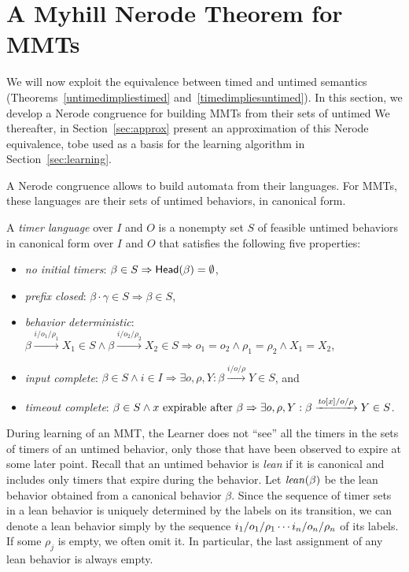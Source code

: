 \section{A Myhill Nerode Theorem for MMTs}
\label{sec:nerode}
\label{sec:bj-nerode}

We will now exploit the equivalence between timed and untimed semantics
(Theorems~\ref{untimedimpliestimed} and~\ref{timedimpliesuntimed}).
In this section, we develop a Nerode congruence for building MMTs
from their sets of untimed
We thereafter, in Section~\ref{sec:approx} present an approximation of this
Nerode equivalence, tobe used as a basis for the learning algorithm in
Section~\ref{sec:learning}.

  A Nerode congruence allows to build automata from their languages. For MMTs,
  these languages are their sets of untimed behaviors, in canonical form.

\begin{definition}
\label{def:timer language}
A \emph{timer language} over $I$ and $O$ is a nonempty set 
$S$ of feasible untimed behaviors in canonical form over $I$ and $O$ that satisfies the following five properties:
\begin{itemize}
\item
\emph{no initial timers}: $\beta \in S \Rightarrow \mathsf{Head}({\beta}) = \emptyset$,
\item
\emph{prefix closed}: $\beta \cdot \gamma \in S \Rightarrow \beta \in S$,
\item
\emph{behavior deterministic}:
$\beta \xrightarrow{i/o_1/\rho_1} X_1 \in S \wedge \beta \xrightarrow{i/o_2/\rho_2} X_2 \in S \Rightarrow o_1 = o_2 \wedge \rho_1 = \rho_2 \wedge X_1 = X_2$,
\item
\emph{input complete}:
$\beta \in S \wedge i \in I \Rightarrow \exists o, \rho, Y : \beta \xrightarrow{i/o/\rho} Y \in S$,
and
\item
\emph{timeout complete}:
$\beta \in S \wedge x \mbox{ expirable after } \beta \Rightarrow
\exists o, \rho, Y: \beta \xrightarrow{\mathit{to}[x]/o/\rho} Y \in S$.
\end{itemize}
\end{definition}

During learning of an MMT, the Learner does not ``see'' all the timers
in the sets of timers of an untimed behavior, only those that have
been observed to expire at some later point. 
Recall that an untimed behavior is {\em lean} if it is canonical and
includes only timers that expire during the behavior.
Let $\mathit{lean}({\beta})$ be the lean behavior obtained from a canonical
behavior $\beta$.
Since the sequence of timer sets in a lean behavior is
uniquely determined by the labels on its transition, we can
denote a lean behavior simply by the sequence
$i_1/o_1/\rho_1 \cdots i_n/o_n/\rho_n$ of its labels.
If some $\rho_j$ is empty, we often omit it. In particular,
the last assignment of any lean behavior is always empty.

